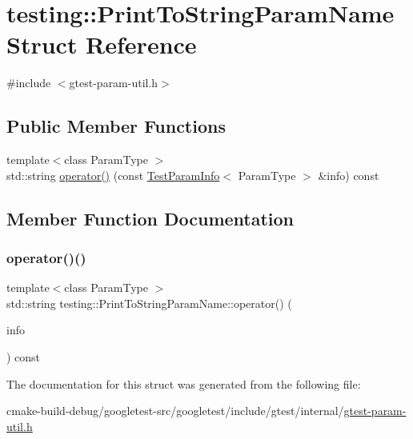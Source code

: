\hypertarget{structtesting_1_1PrintToStringParamName}{}\section{testing\+::Print\+To\+String\+Param\+Name Struct Reference}
\label{structtesting_1_1PrintToStringParamName}


{\ttfamily \#include $<$gtest-\/param-\/util.\+h$>$}

\subsection*{Public Member Functions}
\begin{DoxyCompactItemize}
\item 
{\footnotesize template$<$class Param\+Type $>$ }\\std\+::string \mbox{\hyperlink{structtesting_1_1PrintToStringParamName_a05b411cfb75dadb2c3c0355aee1dcf21}{operator()}} (const \mbox{\hyperlink{structtesting_1_1TestParamInfo}{Test\+Param\+Info}}$<$ Param\+Type $>$ \&info) const
\end{DoxyCompactItemize}


\subsection{Member Function Documentation}
\mbox{\label{structtesting_1_1PrintToStringParamName_a05b411cfb75dadb2c3c0355aee1dcf21}} 
\subsubsection{\texorpdfstring{operator()()}{operator()()}}
{\footnotesize\ttfamily template$<$class Param\+Type $>$ \\
std\+::string testing\+::\+Print\+To\+String\+Param\+Name\+::operator() (\begin{DoxyParamCaption}\item[{const \mbox{\hyperlink{structtesting_1_1TestParamInfo}{Test\+Param\+Info}}$<$ Param\+Type $>$ \&}]{info }\end{DoxyParamCaption}) const\hspace{0.3cm}{\ttfamily [inline]}}



The documentation for this struct was generated from the following file\+:\begin{DoxyCompactItemize}
\item 
cmake-\/build-\/debug/googletest-\/src/googletest/include/gtest/internal/\mbox{\hyperlink{gtest-param-util_8h}{gtest-\/param-\/util.\+h}}\end{DoxyCompactItemize}
